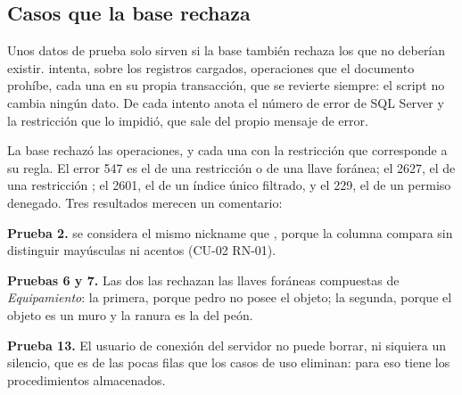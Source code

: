 \subsection*{Casos que la base rechaza}

Unos datos de prueba solo sirven si la base también rechaza los que no deberían existir.  intenta, sobre los registros cargados, \dnNumPruebasRechazo{} operaciones que el documento prohíbe, cada una en su propia transacción, que se revierte siempre: el script no cambia ningún dato. De cada intento anota el número de error de SQL Server y la restricción que lo impidió, que sale del propio mensaje de error.




La base rechazó las \dnNumPruebasRechazadas{} operaciones, y cada una con la restricción que corresponde a su regla. El error 547 es el de una restricción  o de una llave foránea; el 2627, el de una restricción ; el 2601, el de un índice único filtrado, y el 229, el de un permiso denegado. Tres resultados merecen un comentario:

\begin{reglas}
  \item \textbf{Prueba 2.}  se considera el mismo nickname que , porque la columna compara sin distinguir mayúsculas ni acentos (\mbox{CU-02} \mbox{RN-01}).
  \item \textbf{Pruebas 6 y 7.} Las dos las rechazan las llaves foráneas compuestas de \textit{Equipamiento}: la primera, porque pedro no posee el objeto; la segunda, porque el objeto es un muro y la ranura es la del peón.
  \item \textbf{Prueba 13.} El usuario de conexión del servidor no puede borrar, ni siquiera un silencio, que es de las pocas filas que los casos de uso eliminan: para eso tiene los procedimientos almacenados.
\end{reglas}
